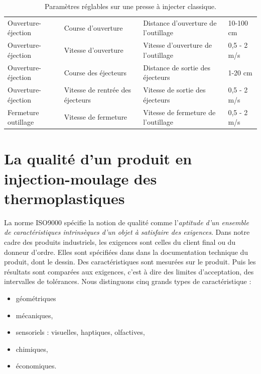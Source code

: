 \begin{table}[thbp]
\begin{tabular}{|llll|}
		Ouverture-éjection     & Course d'ouverture               & Distance d'ouverture de l'outillage                                       & 10-100 cm                      \\
		Ouverture-éjection     & Vitesse d'ouverture              & Vitesse d'ouverture de l'outillage                                        & 0,5 - 2 m/s                    \\
		Ouverture-éjection     & Course des éjecteurs             & Distance de sortie des éjecteurs                                      & 1-20 cm                        \\
		Ouverture-éjection     & Vitesse de rentrée des éjecteurs & Vitesse de sortie des éjecteurs                                                               & 0,5 - 2 m/s                    \\
		Fermeture outillage      & Vitesse de fermeture             & Vitesse de fermeture de l'outillage                                                           & 0,5 - 2 m/s                   \\
		\hline
	\end{tabular}%
	\caption{Paramètres réglables sur une presse à injecter classique.}
	\label{tab:process_parameters}
\end{table}


\newpage
\section{La qualité d'un produit en injection-moulage des thermoplastiques} \label{sec:quality_definition}

La norme ISO9000 \cite{ISO_9000_2015} spécifie la notion de qualité comme l'\textit{aptitude d'un ensemble de caractéristiques intrinsèques d'un objet à satisfaire des exigences}.
Dans notre cadre des produits industriels, les exigences sont celles du client final ou du donneur d'ordre.
Elles sont spécifiées dans dans la documentation technique du produit, dont le dessin.
Des caractéristiques sont mesurées sur le produit.
Puis les résultats sont comparées aux exigences, c'est à dire des limites d'acceptation, des intervalles de tolérances.
Nous distinguons cinq grands types de caractéristique :
\begin{itemize}
	\item géométriques  %
	\item mécaniques,
	\item sensoriels : visuelles, haptiques, olfactives,
	\item chimiques,
	\item économiques.
\end{itemize}

